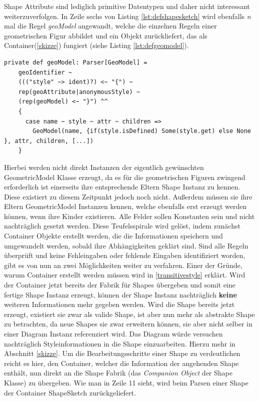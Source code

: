 Shape Attribute sind lediglich primitive Datentypen und daher nicht interessant weiterzuverfolgen. In Zeile sechs von Listing \ref{lst:defshapesketch} wird ebenfalls \textit{n} mal die Regel \textit{geoModel} angewandt, welche die einzelnen Regeln einer geometrischen Figur abbildet und ein Objekt zurückliefert, das als Container(\ref{skizze}) fungiert (siehe Listing \ref{lst:defgeomodel}).
\begin{lstlisting}[style=scala, caption = {Auszug aus Code Regel zum Parsen geometrischer Figuren}, label = {lst:defgeomodel}]
private def geoModel: Parser[GeoModel] =
    geoIdentifier ~
    ((("style" ~> ident)?) <~ "{") ~
    rep(geoAttribute|anonymousStyle) ~
    (rep(geoModel) <~ "}") ^^
    {
      case name ~ style ~ attr ~ children =>
        GeoModel(name, {if(style.isDefined) Some(style.get) else None }, attr, children, [...])
    }
\end{lstlisting}Hierbei werden nicht direkt Instanzen der eigentlich gewünschten GeometricModel Klasse erzeugt, da es für die geometrischen Figuren zwingend erforderlich ist einerseits ihre entsprechende Eltern Shape Instanz zu kennen. Diese existiert zu diesem Zeitpunkt jedoch noch nicht. Außerdem müssen sie ihre Eltern GeometricModel Instanzen kennen, welche ebenfalls erst erzeugt werden können, wenn ihre Kinder existieren. Alle Felder sollen Konstanten sein und nicht nachträglich gesetzt werden. Diese Teufelsspirale wird gelöst, indem zunächst Container Objekte erstellt werden, die die Informationen speichern und umgewandelt werden, sobald ihre Abhängigkeiten geklärt sind. Sind alle Regeln überprüft und keine Fehleingaben oder fehlende Eingaben identifiziert worden, gibt es von nun an zwei Möglichkeiten weiter zu verfahren. Einer der Gründe, warum Container erstellt werden müssen wird in \ref{transitivestyle} erklärt. Wird der Container jetzt bereits der Fabrik für Shapes übergeben und somit eine fertige Shape Instanz erzeugt, können der Shape Instanz nachträglich \textbf{keine} weiteren Informationen mehr gegeben werden.
Wird die Shape bereits jetzt erzeugt, existiert sie zwar als valide Shape, ist aber nun mehr als abstrakte Shape zu betrachten, da neue Shapes sie zwar erweitern können, sie aber nicht selber in einer Diagram Instanz referenziert wird. Das Diagram würde versuchen nachträglich Styleinformationen in die Shape einzuarbeiten. Hierzu mehr in Abschnitt \ref{skizze}. Um die Bearbeitungsschritte einer Shape zu verdeutlichen reicht es hier, den Container, welcher die Information der angehenden Shape enthält, nun direkt an die Shape Fabrik (das \textit{Companion Object} der Shape Klasse) zu übergeben. Wie man in Zeile 11 sieht, wird beim Parsen einer Shape der Container ShapeSketch zurückgeliefert.
